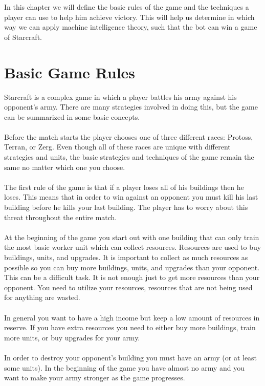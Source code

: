 In this chapter we will define the basic rules of the game and the techniques a player can use to help him achieve victory.
This will help us determine in which way we can apply machine intelligence theory, such that the bot can win a game of Starcraft. 

\section{Basic Game Rules}
	Starcraft is a complex game in which a player battles his army against his opponent's army. 
	There are many strategies involved in doing this, but the game can be summarized in some basic concepts.
\\
\\
	Before the match starts the player chooses one of three different races: Protoss, Terran, or Zerg. 
	Even though all of these races are unique with different strategies and units, 
	the basic strategies and techniques of the game remain the same no matter which one you choose.
\\
\\	
	The first rule of the game is that if a player loses all of his buildings then he loses. 
	This means that in order to win against an opponent you must kill his last building before he kills your last building. The player has to worry about this threat throughout the entire match.
\\
\\	
	At the beginning of the game you start out with one building that can only train the most basic worker unit which can collect resources. 
	Resources are used to buy buildings, units, and upgrades. 
	It is important to collect  as much resources as possible so you can buy more buildings, units, and upgrades than your opponent.
	This can be a difficult task. It is not enough just to get more resources than your opponent. 
	You need to utilize your resources, resources that are not being used for anything are wasted.
\\
\\ 
	In general you want to have a high income but keep a low amount of resources in reserve. 
	If you have extra resources you need to either buy more buildings, train more units, or buy upgrades for your army.\\
\\
	In order to destroy your opponent's building you must have an army (or at least some units). 
	In the beginning of the game you have almost no army and you want to make your army stronger as the game progresses. 
